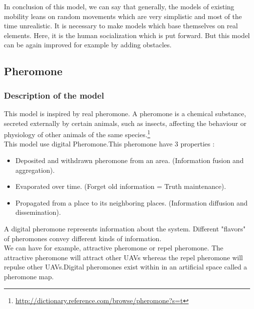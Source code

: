 In conclusion of this model, we can say that generally, the models of existing mobility leans on random movements which are very simplistic and most of the time unrealistic. It is necessary to make models which base themselves on real elements. Here, it is the human socialization which is put forward. But this model can be again improved for example by adding obstacles.



\newpage
\subsection{Pheromone}

\subsubsection{Description of the model}
This model is inspired by real pheromone. A pheromone is a chemical substance, secreted externally by certain animals, such as insects, affecting the behaviour or physiology of other animals of the same species.\footnote{\url{http://dictionary.reference.com/browse/pheromone?s=t}}
\\
This model use digital Pheromone.This pheromone have 3 properties :

\begin{itemize}
\item  Deposited and withdrawn pheromone from an area. (Information fusion and aggregation).
\item  Evaporated over time. (Forget old information = Truth maintenance).
\item  Propagated from a place to its neighboring places. (Information diffusion and dissemination). 
\end{itemize}

A  digital  pheromone  represents  information  about  the  system. Different  "flavors"  of  pheromones convey different kinds of information.\\ We can have for example, attractive pheromone or repel pheromone. The attractive pheromone will attract other UAVs whereas the repel pheromone will repulse other UAVs.Digital pheromones exist within in an artificial space called a pheromone map.


